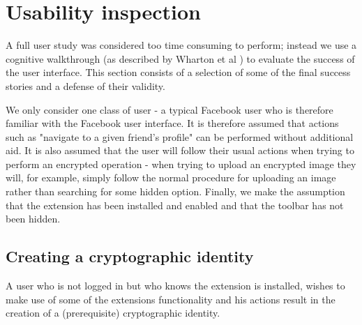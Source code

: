 \section{Usability inspection}
\label{sec:use}

A full user study was considered too time consuming to perform; instead we use a cognitive walkthrough (as described by Wharton et al \cite{cogwalk}) to evaluate the success of the user interface. This section consists of a selection of some of the final success stories and a defense of their validity.

We only consider one class of user - a typical Facebook user who is therefore familiar with the Facebook user interface. It is therefore assumed that actions such as "navigate to a given friend's profile" can be performed without additional aid. It is also assumed that the user will follow their usual actions when trying to perform an encrypted operation - when trying to upload an encrypted image they will, for example, simply follow the normal procedure for uploading an image rather than searching for some hidden option. Finally, we make the assumption that the extension has been installed and enabled and that the toolbar has not been hidden.


\subsection{Creating a cryptographic identity}
A user who is not logged in but who knows the extension is installed, wishes to make use of some of the extensions functionality and his actions result in the creation of a (prerequisite) cryptographic identity.

